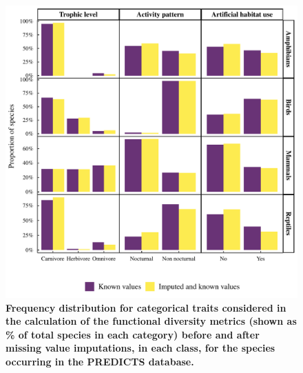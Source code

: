 \newpage
\begin{figure}[h!]
\centering
\includegraphics[scale=0.8]{Supporting/Chapter3/Figures/SI_dist_cat}
\caption[Frequency distribution for categorical traits considered in the calculation of the functional diversity metrics]{\textbf{Frequency distribution for categorical traits considered in the calculation of the functional diversity metrics (shown as \% of total species in each category) before and after missing value imputations, in each class, for the species occurring in the PREDICTS database.}}
\label{SI3_F7}
\end{figure}
\newpage

